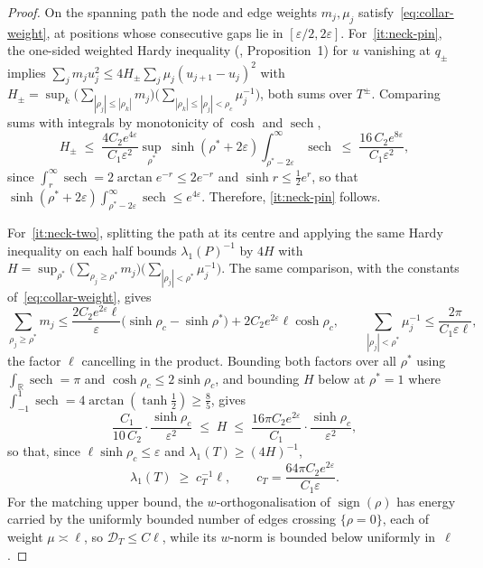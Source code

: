 \documentclass[10pt,reqno]{amsart}
\theoremstyle{remark}
\newcommand{\DD}{\mathcal{D}}
\begin{document}
\begin{proof}
On the spanning path the node and edge weights $m_j,\mu_j$
satisfy~\eqref{eq:collar-weight}, at positions whose consecutive gaps
lie in $[\varepsilon/2,2\varepsilon]$. For~\ref{it:neck-pin}, the one-sided weighted
Hardy inequality (\cite{Miclo}, Proposition~1) for $u$ vanishing at
$q_\pm$ implies $\sum_jm_ju_j^2\le4H_\pm\sum_j\mu_j(u_{j+1}-u_j)^2$ with
$H_\pm=\sup_k\bigl(\sum_{|\rho_j|\le|\rho_k|}m_j\bigr)
\bigl(\sum_{|\rho_k|\le|\rho_j|<\rho_c}\mu_j^{-1}\bigr)$, both sums over
$T^\pm$. Comparing sums with integrals by monotonicity of $\cosh$ and
$\operatorname{sech}$,
\[
  H_\pm\;\le\;\frac{4C_2e^{4\varepsilon}}{C_1\varepsilon^{2}}
  \sup_{\rho^*}\;
  \sinh(\rho^*+2\varepsilon)\!\int_{\rho^*-2\varepsilon}^{\infty}
  \!\operatorname{sech}
  \;\le\;\frac{16\,C_2e^{8\varepsilon}}{C_1\varepsilon^{2}},
\]
since $\int_r^\infty\operatorname{sech}=2\arctan e^{-r}\le2e^{-r}$ and
$\sinh r\le\tfrac12e^r$, so that
$\sinh(\rho^*+2\varepsilon)\int_{\rho^*-2\varepsilon}^\infty
\operatorname{sech}\le e^{4\varepsilon}$. Therefore, \ref{it:neck-pin} follows.

For~\ref{it:neck-two}, splitting the path at its centre and applying
the same Hardy inequality on each half bounds $\lambda_1(P)^{-1}$ by
$4H$ with
$H=\sup_{\rho^*}\bigl(\sum_{\rho_j\ge\rho^*}m_j\bigr)
\bigl(\sum_{|\rho_j|<\rho^*}\mu_j^{-1}\bigr)$. The same comparison,
with the constants of~\eqref{eq:collar-weight}, gives
\[
  \sum_{\rho_j\ge\rho^*}m_j\le
  \frac{2C_2e^{2\varepsilon}\ell}{\varepsilon}
  \bigl(\sinh\rho_c-\sinh\rho^*\bigr)
  +2C_2e^{2\varepsilon}\ell\cosh\rho_c,
  \qquad
  \sum_{|\rho_j|<\rho^*}\mu_j^{-1}\le\frac{2\pi}{C_1\varepsilon\ell},
\]
the factor $\ell$ cancelling in the product. Bounding both factors over all $\rho^*$
using $\int_{\mathbb R}\operatorname{sech}=\pi$ and
$\cosh\rho_c\le2\sinh\rho_c$, and bounding $H$ below at $\rho^*=1$ where
$\int_{-1}^{1}\operatorname{sech}=4\arctan(\tanh\tfrac12)\ge\tfrac85$,
gives
\begin{equation}
\label{eq:H-bounds}
  \frac{C_1}{10\,C_2}\cdot\frac{\sinh\rho_c}{\varepsilon^2}
  \;\le\;H\;\le\;
  \frac{16\pi C_2e^{2\varepsilon}}{C_1}\cdot\frac{\sinh\rho_c}{\varepsilon^2},
\end{equation}
so that, since $\ell\sinh\rho_c\le\varepsilon$ and
$\lambda_1(T)\ge(4H)^{-1}$,
\begin{equation}
\label{eq:cT}
  \lambda_1(T)\;\ge\;c_T^{-1}\ell,
  \qquad
  c_T=\frac{64\pi C_2e^{2\varepsilon}}{C_1\varepsilon}.
\end{equation}
For the matching upper bound, the
$w$-orthogonalisation of $\operatorname{sign}(\rho)$ has energy carried
by the uniformly bounded number of edges crossing $\{\rho=0\}$, each of
weight $\mu\asymp\ell$, so $\DD_T\le C\ell$, while its $w$-norm is
bounded below uniformly in~$\ell$.
\end{proof}
\end{document}
